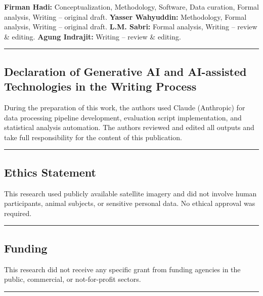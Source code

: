 \textbf{Firman Hadi:} Conceptualization, Methodology, Software, Data curation, Formal analysis, Writing -- original draft. \textbf{Yasser Wahyuddin:} Methodology, Formal analysis, Writing -- original draft. \textbf{L.M. Sabri:} Formal analysis, Writing -- review \& editing. \textbf{Agung Indrajit:} Writing -- review \& editing.

\begin{center}\rule{0.5\linewidth}{0.5pt}\end{center}

\subsection{Declaration of Generative AI and AI-assisted Technologies in the Writing Process}\label{declaration-of-generative-ai-and-ai-assisted-technologies-in-the-writing-process}

During the preparation of this work, the authors used Claude (Anthropic) for data processing pipeline development, evaluation script implementation, and statistical analysis automation. The authors reviewed and edited all outputs and take full responsibility for the content of this publication.

\begin{center}\rule{0.5\linewidth}{0.5pt}\end{center}

\subsection{Ethics Statement}\label{ethics-statement}

This research used publicly available satellite imagery and did not involve human participants, animal subjects, or sensitive personal data. No ethical approval was required.

\begin{center}\rule{0.5\linewidth}{0.5pt}\end{center}

\subsection{Funding}\label{funding}

This research did not receive any specific grant from funding agencies in the public, commercial, or not-for-profit sectors.

\begin{center}\rule{0.5\linewidth}{0.5pt}\end{center}


